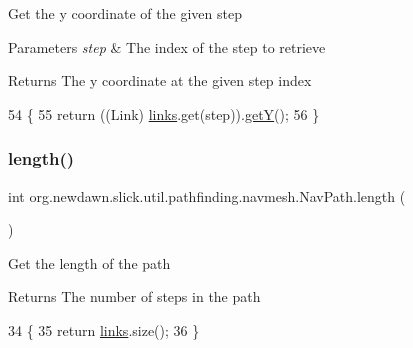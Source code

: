 Get the y coordinate of the given step


\begin{DoxyParams}{Parameters}
{\em step} & The index of the step to retrieve \\
\hline
\end{DoxyParams}
\begin{DoxyReturn}{Returns}
The y coordinate at the given step index 
\end{DoxyReturn}

\begin{DoxyCode}
54                                 \{
55         \textcolor{keywordflow}{return} ((Link) \mbox{\hyperlink{classorg_1_1newdawn_1_1slick_1_1util_1_1pathfinding_1_1navmesh_1_1_nav_path_aa79523223a18486178fbb21fe550f253}{links}}.get(step)).\mbox{\hyperlink{classorg_1_1newdawn_1_1slick_1_1util_1_1pathfinding_1_1navmesh_1_1_nav_path_a9070ea91900af3a0ba8a76b6a6067a08}{getY}}();
56     \}
\end{DoxyCode}
\mbox{\label{classorg_1_1newdawn_1_1slick_1_1util_1_1pathfinding_1_1navmesh_1_1_nav_path_a57379bacf5476fb52e7f42d4565f37ac}} 
\subsubsection{\texorpdfstring{length()}{length()}}
{\footnotesize\ttfamily int org.\+newdawn.\+slick.\+util.\+pathfinding.\+navmesh.\+Nav\+Path.\+length (\begin{DoxyParamCaption}{ }\end{DoxyParamCaption})\hspace{0.3cm}{\ttfamily [inline]}}

Get the length of the path

\begin{DoxyReturn}{Returns}
The number of steps in the path 
\end{DoxyReturn}

\begin{DoxyCode}
34                         \{
35         \textcolor{keywordflow}{return} \mbox{\hyperlink{classorg_1_1newdawn_1_1slick_1_1util_1_1pathfinding_1_1navmesh_1_1_nav_path_aa79523223a18486178fbb21fe550f253}{links}}.size();
36     \}
\end{DoxyCode}
\mbox{\label{classorg_1_1newdawn_1_1slick_1_1util_1_1pathfinding_1_1navmesh_1_1_nav_path_adc600d773ef90ccfa1f694a4360de4ce}} 
